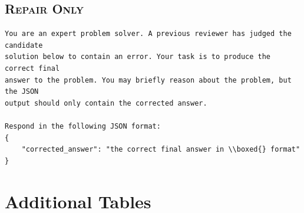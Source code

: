 \documentclass[journal]{IEEEtran}
\begin{document}
\subsection*{\textsc{Repair Only}}
\begin{footnotesize}
\begin{verbatim}
You are an expert problem solver. A previous reviewer has judged the candidate
solution below to contain an error. Your task is to produce the correct final
answer to the problem. You may briefly reason about the problem, but the JSON
output should only contain the corrected answer.

Respond in the following JSON format:
{
    "corrected_answer": "the correct final answer in \\boxed{} format"
}
\end{verbatim}
\end{footnotesize}

\section{Additional Tables}
\label{app:additional}

\begin{table}[h]
\centering
\small
{}
\caption{Per-dataset parser-aware Caveat A contrasts. Values are Verdict+Repair minus Verdict-Only Neutral FAR differences in percentage points on actually wrong solutions. Included uses the production parsed-output metric; excluded removes pairs containing a parse failure. Pair counts are included/excluded.}
\label{tab:appendix-caveat-dataset}
\end{table}
\end{document}
